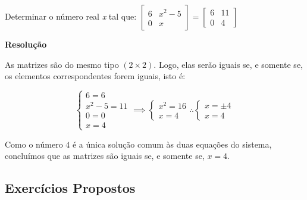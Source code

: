 \begin{exercise}
	Determinar o número real \textit{x} tal que: $\begin{bmatrix}
			6 & x^2-5 \\
			0 & x
		\end{bmatrix} = \begin{bmatrix}
			6 & 11 \\
			0 & 4
		\end{bmatrix}$

	\vspace{.3cm}
	\textbf{Resolução} \vspace{.3cm}

	As matrizes são do mesmo tipo $(2 \times 2)$. Logo, elas serão iguais se, e somente se, os elementos
	correspondentes forem iguais, isto é:

	\begin{equation*}
		\begin{cases}
			6 = 6        \\
			x^2 - 5 = 11 \\
			0 = 0        \\
			x = 4
		\end{cases}
		\implies
		\begin{cases}
			x^2 = 16 \\
			x = 4
		\end{cases}
		\therefore
		\begin{cases}
			x = \pm 4 \\
			x = 4
		\end{cases}
	\end{equation*}

	Como o número $4$ é a única solução comum às duas equações do sistema, concluímos que as matrizes são iguais se, e
	somente se, $x = 4$.

\end{exercise}

\subsection{Exercícios Propostos}

